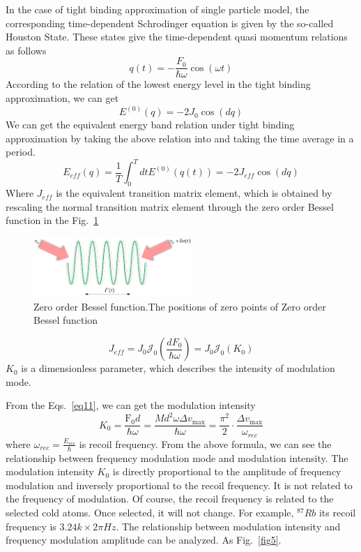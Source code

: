 \documentclass[
 reprint,
amsmath,amssymb,
aps,
pra,
floatfix,
]{revtex4-2}
\begin{document}
In the case of tight binding approximation of single particle model, 
the corresponding time-dependent Schrodinger equation is given by the so-called Houston State.
These states give the time-dependent quasi momentum relations as follows
\begin{equation}
  q(t)=-\frac{F_{0}}{\hbar \omega} \cos (\omega t)
  \label{eq7}
\end{equation}
According to the relation of the lowest energy level in the tight binding approximation, we can get
\begin{equation}
  E^{(0)}(q)=-2 J_{0} \cos (d q)
\end{equation}
We can get the equivalent energy band relation under tight binding approximation by taking the above relation into and taking the time average in a period.
\begin{equation}
  E_{e f f}(q)=\frac{1}{T} \int_{0}^{T} d t E^{(0)}(q(t))=-2 J_{e f f} \cos (d q)
\end{equation}
Where $J_{e f f}$ is the equivalent transition matrix element, 
which is obtained by rescaling the normal transition matrix element through the zero order Bessel function in the Fig.~\ref{fig2}
\begin{figure}[b]
  \includegraphics[width = 6cm]{fig2.eps}
  \caption{\label{fig2} Zero order Bessel function.The positions of zero points of Zero order Bessel function}
\end{figure}
\begin{equation}
  J_{e f f}=J_{0} \mathcal{J}_{0}\left(\frac{d F_{0}}{\hbar \omega}\right)=J_{0} \mathcal{J}_{0}\left(K_{0}\right)
\end{equation}
$K_{0}$ is a dimensionless parameter, which describes the intensity of modulation mode.

From the Eqs.~\ref{eq11}, we can get the modulation intensity
\begin{equation}
  K_{0}=\frac{\mathrm{F}_{0} d}{\hbar \omega}=\frac{M d^{2} \omega \Delta v_{\max }}{\hbar \omega}=\frac{\pi^{2}}{2} \cdot \frac{\Delta v_{\max }}{\omega_{r e c}}
\end{equation}
where $\omega_{r e c}=\frac{E_{r e c}}{\hbar}$ is recoil frequency.
From the above formula, we can see the relationship between frequency modulation mode and modulation intensity. 
The modulation intensity $K_{0}$ is directly proportional to the amplitude of frequency modulation and inversely proportional to the recoil frequency. 
It is not related to the frequency of modulation. 
Of course, the recoil frequency is related to the selected cold atoms. Once selected, it will not change.
For example, $^{87} R b$ its recoil frequency is $3.24 k \times 2\pi Hz$. The relationship between modulation intensity and frequency modulation amplitude can be analyzed.
As Fig.~\ref{fig5}.
\end{document}
